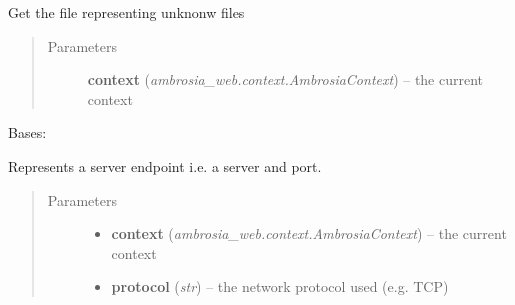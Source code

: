 \documentclass[letterpaper,10pt,english]{sphinxmanual}
\begin{document}
\begin{fulllineitems}
\begin{fulllineitems}
\label{ambrosia.model:ambrosia.model.entities.File.unknown}
Get the file representing unknonw files
\begin{quote}\begin{description}
\item[{Parameters}] \leavevmode
\textbf{context} (\emph{ambrosia\_web.context.AmbrosiaContext}) -- the current context

\end{description}\end{quote}

\end{fulllineitems}


\end{fulllineitems}


\begin{fulllineitems}
\label{ambrosia.model:ambrosia.model.entities.ServerEndpoint}
Bases: {\hyperref[ambrosia.model:ambrosia.model.Entity]{}}

Represents a server endpoint i.e. a server and port.
\begin{quote}\begin{description}
\item[{Parameters}] \leavevmode\begin{itemize}
\item {} 
\textbf{context} (\emph{ambrosia\_web.context.AmbrosiaContext}) -- the current context

\item {} 
\textbf{protocol} (\emph{str}) -- the network protocol used (e.g. TCP)

\end{itemize}

\end{description}\end{quote}

\begin{fulllineitems}
\label{ambrosia.model:ambrosia.model.entities.ServerEndpoint.find}
\end{fulllineitems}


\begin{fulllineitems}
\label{ambrosia.model:ambrosia.model.entities.ServerEndpoint.get_serializeable_properties}
\end{fulllineitems}


\end{fulllineitems}
\end{document}
